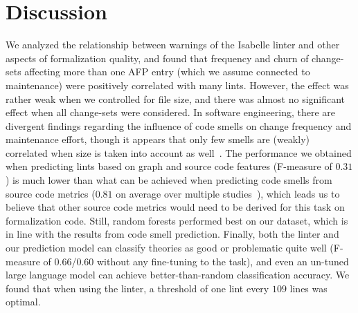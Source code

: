 \section{Discussion}\label{sec:conclusion}
We analyzed the relationship between warnings of the Isabelle linter and other aspects of formalization quality,
and found that frequency and churn of change-sets affecting more than one AFP entry
(which we assume connected to maintenance)
were positively correlated with many lints.
However, the effect was rather weak when we controlled for file size,
and there was almost no significant effect when all change-sets were considered.
In software engineering,
there are divergent findings regarding the influence of code smells on change frequency and maintenance effort,
though it appears that only few smells are (weakly) correlated when size is taken into account as well~\cite{Smells2012Sjoberg,Smells2010Olbrich,Smells2013Yamashita}.
The performance we obtained when predicting lints based on graph and source code features
(F-measure of $0.31$)
is much lower than what can be achieved when predicting code smells from source code metrics
($0.81$ on average over multiple studies~\cite{SmellPredOverview2019Azeem}),
which leads us to believe that other source code metrics would need to be derived for this task on formalization code.
Still, random forests performed best on our dataset,
which is in line with the results from code smell prediction.
Finally,
both the linter and our prediction model can classify theories as good or problematic quite well
(F-measure of $0.66$/$0.60$ without any fine-tuning to the task),
and even an un-tuned large language model can achieve better-than-random classification accuracy.
We found that when using the linter, a threshold of one lint every $109$ lines was optimal.

